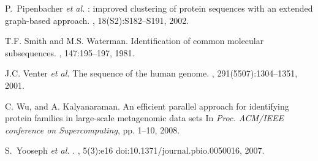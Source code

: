 \documentclass[10pt,journal,letterpaper,compsoc]{IEEEtran}
\begin{document}
\begin{thebibliography}{1}
P.~Pipenbacher {\it et al.}
: improved clustering of protein sequences with an extended graph-based approach.
, 18(S2):S182--S191, 2002.


T.F. Smith and M.S. Waterman.
\newblock Identification of common molecular subsequences.
, 147:195--197, 1981.


J.C. Venter {\it et al.}
\newblock The sequence of the human genome.
, 291(5507):1304--1351, 2001.


C. Wu, and A. Kalyanaraman.
\newblock An efficient parallel approach for identifying protein families in large-scale metagenomic data sets
\newblock In {\em Proc. ACM/IEEE conference on Supercomputing}, pp. 1--10, 2008.


S.~Yooseph {\it et al.}
.
, 5(3):e16 doi:10.1371/journal.pbio.0050016,
  2007.




\end{thebibliography}




\end{document}
